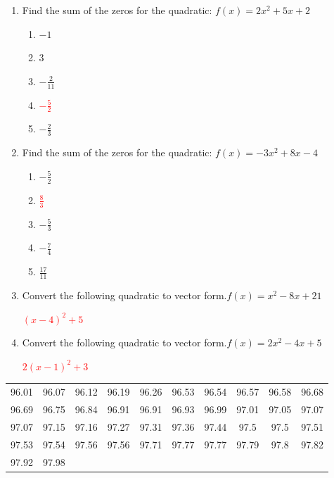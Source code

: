 \documentclass{article}
\begin{document}
\begin{enumerate}

    \item Find the sum of the zeros for the quadratic: 
         $f(x)=2 x^{2} + 5 x + 2$
    \begin{enumerate}
        \item  $ -1 $
        \item  $ 3 $
        \item  $ - \frac{2}{11} $
        \item \textcolor{red}{$ - \frac{5}{2} $}
        \item  $ - \frac{2}{3} $
    \end{enumerate}

    \item Find the sum of the zeros for the quadratic: 
         $f(x)=- 3 x^{2} + 8 x - 4$
    \begin{enumerate}
        \item  $ - \frac{5}{2} $
        \item \textcolor{red}{$ \frac{8}{3} $}
        \item  $ - \frac{5}{3} $
        \item  $ - \frac{7}{4} $
        \item  $ \frac{17}{11} $
    \end{enumerate}

    \item Convert the following quadratic to vector form.$f(x)=x^{2} - 8 x + 21$

\textcolor{red}{$\left(x - 4\right)^{2} + 5$}


    \item Convert the following quadratic to vector form.$f(x)=2 x^{2} - 4 x + 5$

\textcolor{red}{$2 \left(x - 1\right)^{2} + 3$}


    

\end{enumerate}

 \begin{tabular}{|cccccccccc|}\hline 96.01&96.07&96.12&96.19&96.26&96.53&96.54&96.57&96.58&96.68\\ 96.69&96.75&96.84&96.91&96.91&96.93&96.99&97.01&97.05&97.07\\ 97.07&97.15&97.16&97.27&97.31&97.36&97.44&97.5&97.5&97.51\\ 97.53&97.54&97.56&97.56&97.71&97.77&97.77&97.79&97.8&97.82\\ 97.92&97.98&&&&&&&&\\\hline\end{tabular}
\end{document}

